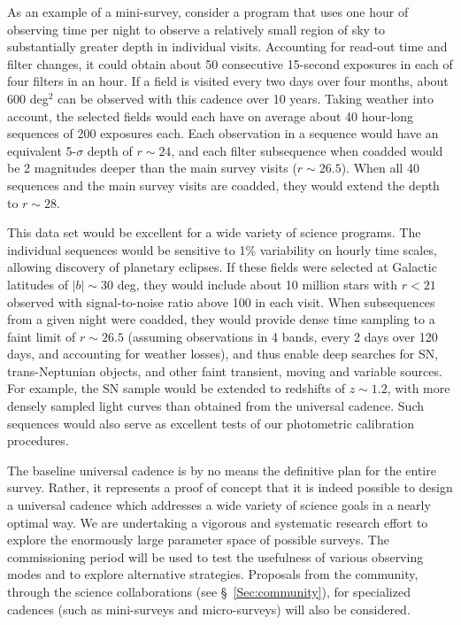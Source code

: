 \documentclass{emulateapj}
\begin{document}
As an example of a mini-survey, consider a program that uses one hour of
observing time per night to observe a relatively small region of sky to
substantially greater depth in individual visits. Accounting for
read-out time and filter changes, it could obtain about 50 consecutive
15-second exposures in each of four filters in an hour. If a field is visited
every two days over four months, about 600 deg$^2$ can be observed with this 
cadence over 10 years. Taking weather into account, the selected fields would 
each have on average about 40 hour-long sequences of 200 exposures each. Each 
observation in a sequence would have an equivalent 5-$\sigma$ depth of
$r\sim24$, and each filter subsequence when coadded would be 2 magnitudes 
deeper than the main survey visits ($r\sim26.5$). When all 40 sequences and 
the main survey visits are coadded, they would extend the depth to $r\sim28$. 

This data set would be excellent for a wide variety of science programs. The 
individual sequences would be sensitive to 1\% variability on hourly time 
scales, allowing discovery of planetary eclipses. If these fields were selected 
at Galactic latitudes of $|b|\sim30$ deg, they would include about 10 million 
stars with $r<21$ observed with signal-to-noise ratio above 100 in each visit.
When subsequences from a given night were coadded, they would 
provide dense time sampling to a faint limit of $r\sim26.5$ (assuming observations
in 4 bands, every 2 days over 120 days, and accounting for weather losses), and thus 
enable deep searches 
for SN, trans-Neptunian objects, and other faint transient, moving and 
variable sources.  For example, the SN sample
would be extended to redshifts of $z\sim1.2$, with more densely sampled light
curves than obtained from the universal cadence. Such sequences would also
serve as excellent tests of our photometric calibration procedures. 


The baseline universal cadence is by no means the definitive plan for the entire
survey. Rather, it represents a proof of concept that it is indeed possible to 
design a universal cadence which addresses a wide variety of science goals in a nearly 
optimal way. We are undertaking a vigorous and systematic research effort to explore 
the enormously large parameter space of possible surveys. The commissioning period 
will be used to test the usefulness of various observing modes and to explore 
alternative strategies. Proposals from the community, through the science collaborations
(see \S~\ref{Sec:community}), for specialized cadences (such as mini-surveys and
micro-surveys) will also be considered.  
\end{document}
